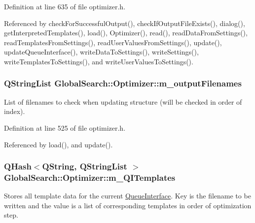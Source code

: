 Definition at line 635 of file optimizer.\-h.



Referenced by check\-For\-Successful\-Output(), check\-If\-Output\-File\-Exists(), dialog(), get\-Interpreted\-Templates(), load(), Optimizer(), read(), read\-Data\-From\-Settings(), read\-Templates\-From\-Settings(), read\-User\-Values\-From\-Settings(), update(), update\-Queue\-Interface(), write\-Data\-To\-Settings(), write\-Settings(), write\-Templates\-To\-Settings(), and write\-User\-Values\-To\-Settings().

\hypertarget{classGlobalSearch_1_1Optimizer_a28a8bf74bf7bdf00d453890796574c7d}{
\subsubsection[{m\-\_\-output\-Filenames}]{\setlength{\rightskip}{0pt plus 5cm}Q\-String\-List Global\-Search\-::\-Optimizer\-::m\-\_\-output\-Filenames\hspace{0.3cm}{\ttfamily [protected]}}}\label{classGlobalSearch_1_1Optimizer_a28a8bf74bf7bdf00d453890796574c7d}
List of filenames to check when updating structure (will be checked in order of index). 

Definition at line 525 of file optimizer.\-h.



Referenced by load(), and update().

\hypertarget{classGlobalSearch_1_1Optimizer_ac23d5114bf09b816666351868d49d1f8}{
\subsubsection[{m\-\_\-\-Q\-I\-Templates}]{\setlength{\rightskip}{0pt plus 5cm}Q\-Hash$<$Q\-String, Q\-String\-List $>$ Global\-Search\-::\-Optimizer\-::m\-\_\-\-Q\-I\-Templates\hspace{0.3cm}{\ttfamily [protected]}}}\label{classGlobalSearch_1_1Optimizer_ac23d5114bf09b816666351868d49d1f8}
Stores all template data for the current \hyperlink{classGlobalSearch_1_1QueueInterface}{Queue\-Interface}. Key is the filename to be written and the value is a list of corresponding templates in order of optimization step. 

